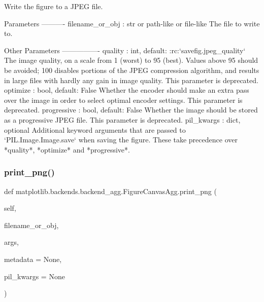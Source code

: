 \begin{DoxyVerb}Write the figure to a JPEG file.

Parameters
----------
filename_or_obj : str or path-like or file-like
    The file to write to.

Other Parameters
----------------
quality : int, default: :rc:`savefig.jpeg_quality`
    The image quality, on a scale from 1 (worst) to 95 (best).
    Values above 95 should be avoided; 100 disables portions of
    the JPEG compression algorithm, and results in large files
    with hardly any gain in image quality.  This parameter is
    deprecated.
optimize : bool, default: False
    Whether the encoder should make an extra pass over the image
    in order to select optimal encoder settings.  This parameter is
    deprecated.
progressive : bool, default: False
    Whether the image should be stored as a progressive JPEG file.
    This parameter is deprecated.
pil_kwargs : dict, optional
    Additional keyword arguments that are passed to
    `PIL.Image.Image.save` when saving the figure.  These take
    precedence over *quality*, *optimize* and *progressive*.
\end{DoxyVerb}
 \mbox{\label{classmatplotlib_1_1backends_1_1backend__agg_1_1FigureCanvasAgg_a15df5f5140d19f202f7e5ca464438b50}} 
\subsubsection{\texorpdfstring{print\+\_\+png()}{print\_png()}}
{\footnotesize\ttfamily def matplotlib.\+backends.\+backend\+\_\+agg.\+Figure\+Canvas\+Agg.\+print\+\_\+png (\begin{DoxyParamCaption}\item[{}]{self,  }\item[{}]{filename\+\_\+or\+\_\+obj,  }\item[{}]{args,  }\item[{}]{metadata = {\ttfamily None},  }\item[{}]{pil\+\_\+kwargs = {\ttfamily None} }\end{DoxyParamCaption})}

